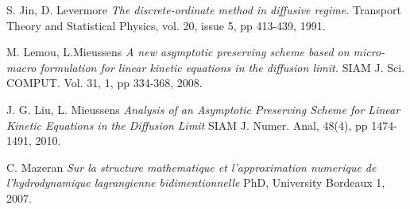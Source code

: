 \documentclass[a4paper,french,english,10pt]{article}
\begin{document}
{\begin{thebibliography}{abcde}
 S. Jin, D. Levermore \emph{The discrete-ordinate method in
diffusive regime.} Transport Theory and Statistical Physics, vol. 20, issue 5,
pp 413-439, 1991.


 M. Lemou, L.Mieussens \emph{A new asymptotic preserving
scheme based on micro-macro formulation for linear kinetic equations in the
diffusion limit.} SIAM J. Sci. COMPUT. Vol. 31, 1, pp 334-368, 2008.

 J. G. Liu, L. Mieussens \emph{Analysis of an Asymptotic
Preserving Scheme for Linear Kinetic Equations in the Diffusion Limit} SIAM J.
Numer. Anal,  48(4), pp 1474-1491, 2010.

 C. Mazeran \emph{Sur la structure mathematique et
l'approximation numerique de l'hydrodynamique lagrangienne bidimentionnelle}
 PhD, University Bordeaux 1, 2007.
\end{thebibliography}

}
\end{document}
